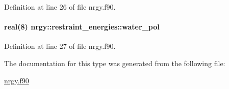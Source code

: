 Definition at line 26 of file nrgy.\-f90.

\hypertarget{structnrgy_1_1restraint__energies_a86b03f60830672f11820c63d62ee2065}{
\paragraph[{water\-\_\-pol}]{\setlength{\rightskip}{0pt plus 5cm}real(8) nrgy\-::restraint\-\_\-energies\-::water\-\_\-pol}}\label{structnrgy_1_1restraint__energies_a86b03f60830672f11820c63d62ee2065}


Definition at line 27 of file nrgy.\-f90.



The documentation for this type was generated from the following file\-:\begin{DoxyCompactItemize}
\item 
\hyperlink{nrgy_8f90}{nrgy.\-f90}\end{DoxyCompactItemize}
